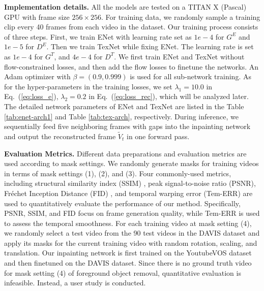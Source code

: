 \noindent \textbf{Implementation details.} 
All the models are tested on a TITAN X (Pascal) GPU with frame size $256 \times 256$.
For training data, we randomly sample a training clip every 40 frames from each video in the dataset. Our training process consists of three steps. First, we train ENet with learning rate set as $1e-4$ for $G^E$ and $1e-5$ for $D^E$. 
Then we train TexNet while fixing ENet. The learning rate is set as $1e-4$ for $G^T$, and $4e-4$ for $D^T$.
We first train ENet and TexNet without flow-constrained losses, and then add the flow losses to finetune the networks.
An Adam optimizer with $\beta=(0.9, 0.999)$ is used for all sub-network training.
As for the hyper-parameters in the training losses, we set $\lambda_1=10.0$ in Eq.~(\ref{eq:loss_e}), $\lambda_2=0.2$ in Eq.~(\ref{eq:loss_rec}), which will be analyzed later. 
{\color{blue} The detailed network parameters of ENet and TexNet are listed in the Table \ref{tab:enet-arch1} and Table \ref{tab:tex-arch}, respectively.
During inference, we sequentially feed five neighboring frames with gaps into the inpainting network and output the reconstructed frame $\widetilde{V}_t$ in one forward pass.
}

\noindent \textbf{Evaluation Metrics.} 
Different data preparations and evaluation metrics are used according to mask settings. We randomly generate masks for training videos in terms of mask settings (1), (2), and (3). 
Four commonly-used metrics, including structural similarity index (SSIM) \cite{wang2004image}, peak signal-to-noise ratio (PSNR), Fr{\'e}chet Inception Distance (FID) \cite{heusel2017gans}, and temporal warping error (Tem-ERR) \cite{Kim_2019_CVPR} are used to quantitatively evaluate the performance of our method. 
{\color{blue}Specifically, PSNR, SSIM, and FID focus on frame generation quality, while Tem-ERR is used to assess the temporal smoothness.} 
For each training video at mask setting (4), we randomly select a test video from the 90 test videos in the DAVIS dataset and apply its masks for the current training video with random rotation, scaling, and translation.
Our inpainting network is first trained on the YoutubeVOS dataset and then finetuned on the DAVIS dataset. 
Since there is no ground truth video for mask setting (4) of foreground object removal, quantitative evaluation is infeasible. Instead, a user study is conducted.  



